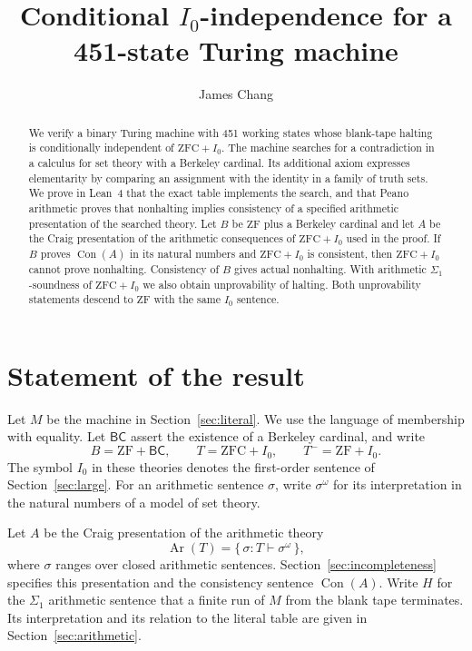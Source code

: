 \documentclass[11pt,letterpaper]{article}
\title{Conditional \texorpdfstring{$I_0$}{I0}-independence for a\\451-state Turing machine}
\author{James Chang}
\date{}
\theoremstyle{definition}
\newcommand{\ZF}{\mathrm{ZF}}
\newcommand{\ZFC}{\mathrm{ZFC}}
\newcommand{\Con}{\operatorname{Con}}
\newcommand{\cardB}{\mathsf{BC}}
\newcommand{\setread}[1]{#1^{\omega}}
\begin{document}
\maketitle

\begin{abstract}
We verify a binary Turing machine with 451 working states whose
blank-tape halting is conditionally independent of $\ZFC+I_0$.
The machine searches for a contradiction in a calculus for set
theory with a Berkeley cardinal. Its additional axiom expresses
elementarity by comparing an assignment with the identity in a
family of truth sets. We prove in Lean~4 that the exact table
implements the search, and that Peano arithmetic proves that
nonhalting implies consistency of a specified arithmetic
presentation of the searched theory. Let $B$ be $\ZF$ plus a
Berkeley cardinal and let $A$ be the Craig presentation of the
arithmetic consequences of $\ZFC+I_0$ used in the proof. If $B$
proves $\Con(A)$ in its natural numbers and $\ZFC+I_0$ is
consistent, then $\ZFC+I_0$ cannot prove nonhalting. Consistency
of $B$ gives actual nonhalting. With arithmetic $\Sigma_1$-soundness
of $\ZFC+I_0$ we also obtain unprovability of halting. Both
unprovability statements descend to $\ZF$ with the same $I_0$ sentence.
\end{abstract}

\section{Statement of the result}\label{sec:result}

Let $M$ be the machine in Section~\ref{sec:literal}. We use the language
of membership with equality. Let $\cardB$ assert the existence of a
Berkeley cardinal, and write
\[
  B=\ZF+\cardB,\qquad T=\ZFC+I_0,\qquad T^-=\ZF+I_0.
\]
The symbol $I_0$ in these theories denotes the first-order sentence
of Section~\ref{sec:large}. For an arithmetic sentence $\sigma$,
write $\setread{\sigma}$ for its interpretation in the natural numbers
of a model of set theory.

Let $A$ be the Craig presentation of the arithmetic theory
\[
  \operatorname{Ar}(T)=\{\,\sigma : T\vdash \setread{\sigma}\,\},
\]
where $\sigma$ ranges over closed arithmetic sentences.
Section~\ref{sec:incompleteness} specifies this presentation and the
consistency sentence $\Con(A)$. Write $H$ for the $\Sigma_1$ arithmetic
sentence that a finite run of $M$ from the blank tape terminates.
Its interpretation and its relation to the literal table are given
in Section~\ref{sec:arithmetic}.
\end{document}

